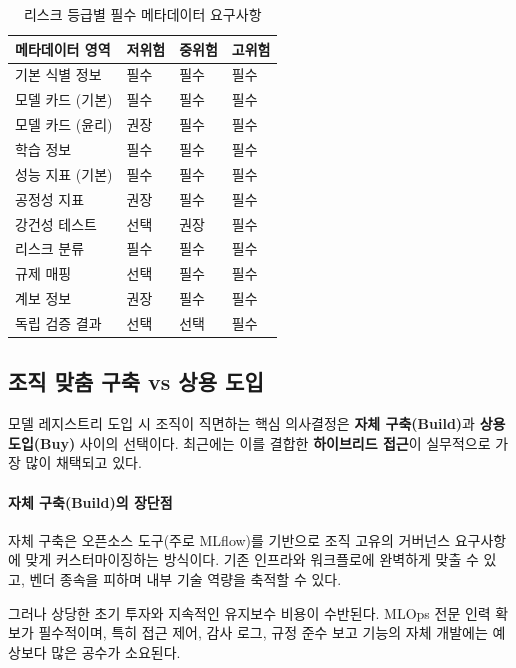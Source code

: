 \begin{table}[htbp]
\centering
\caption{리스크 등급별 필수 메타데이터 요구사항}
\label{tab:14_3}
\begin{tabularx}{\textwidth}{lXXX}
\toprule
\textbf{메타데이터 영역} & \textbf{저위험} & \textbf{중위험} & \textbf{고위험} \\
\midrule
기본 식별 정보 & 필수 & 필수 & 필수 \\
모델 카드 (기본) & 필수 & 필수 & 필수 \\
모델 카드 (윤리) & 권장 & 필수 & 필수 \\
학습 정보 & 필수 & 필수 & 필수 \\
성능 지표 (기본) & 필수 & 필수 & 필수 \\
공정성 지표 & 권장 & 필수 & 필수 \\
강건성 테스트 & 선택 & 권장 & 필수 \\
리스크 분류 & 필수 & 필수 & 필수 \\
규제 매핑 & 선택 & 필수 & 필수 \\
계보 정보 & 권장 & 필수 & 필수 \\
독립 검증 결과 & 선택 & 선택 & 필수 \\
\bottomrule
\end{tabularx}
\end{table}

\subsection{조직 맞춤 구축 vs 상용 도입}
\label{sec:14.1.4}

모델 레지스트리 도입 시 조직이 직면하는 핵심 의사결정은 \textbf{자체 구축(Build)}과 \textbf{상용 도입(Buy)} 사이의 선택이다. 최근에는 이를 결합한 \textbf{하이브리드 접근}이 실무적으로 가장 많이 채택되고 있다\cite{kreuzberger2023machine}.

\paragraph{자체 구축(Build)의 장단점}

자체 구축은 오픈소스 도구(주로 MLflow)를 기반으로 조직 고유의 거버넌스 요구사항에 맞게 커스터마이징하는 방식이다. 기존 인프라와 워크플로에 완벽하게 맞출 수 있고, 벤더 종속을 피하며 내부 기술 역량을 축적할 수 있다.

그러나 상당한 초기 투자와 지속적인 유지보수 비용이 수반된다. MLOps 전문 인력 확보가 필수적이며, 특히 접근 제어, 감사 로그, 규정 준수 보고 기능의 자체 개발에는 예상보다 많은 공수가 소요된다.

